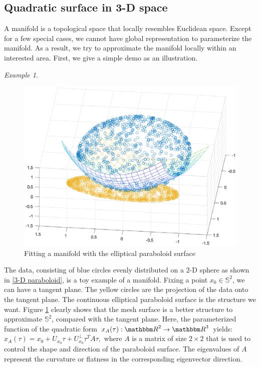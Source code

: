 \documentclass{article}
\theoremstyle{remark}
\newtheorem{example}{Example}
\begin{document}
\subsection{Quadratic surface in 3-D space}
A manifold is a topological space that locally resembles Euclidean space. Except for a few special cases, we cannot have global representation to parameterize the manifold. As a result, we try to approximate the manifold locally within an interested area. First, we give a simple demo as an illustration.
\begin{example}
\vspace{-2mm}
\begin{figure}[ht] %
   \centering
   \includegraphics[width=0.7\linewidth]{demo.eps} 
   \vspace{-0.4cm}
   \caption{Fitting a manifold with the elliptical paraboloid surface}
   \label{3-D paraboloid}
\end{figure}
The data, consisting of blue circles evenly distributed on a 2-D sphere as shown in \eqref{3-D paraboloid}, is a toy example of a manifold. Fixing a point $x_0\in {\mathbb S}^2$, we can have a tangent plane. The yellow circles are the projection of the data onto the tangent plane. The continuous elliptical paraboloid surface is the structure we want.
Figure \ref{3-D paraboloid} clearly shows that the mesh surface is a better structure to approximate $\mathbb{S}^2$, compared with the tangent plane. Here, the parameterized function of the quadratic form  $x_A(\tau): {\mathbbm R}^2\rightarrow {\mathbbm R}^3$ yields:
$
x_A(\tau) = x_0 + U_{x_0} \tau + {U_{x_0}^\perp} \tau^T A \tau,
$
where $A$ is a matrix of size $2\times 2$ that is used to control the shape and direction of the paraboloid surface. The eigenvalues of $A$ represent the curvature or flatness in the corresponding eigenvector direction.
\end{example}
\end{document}
